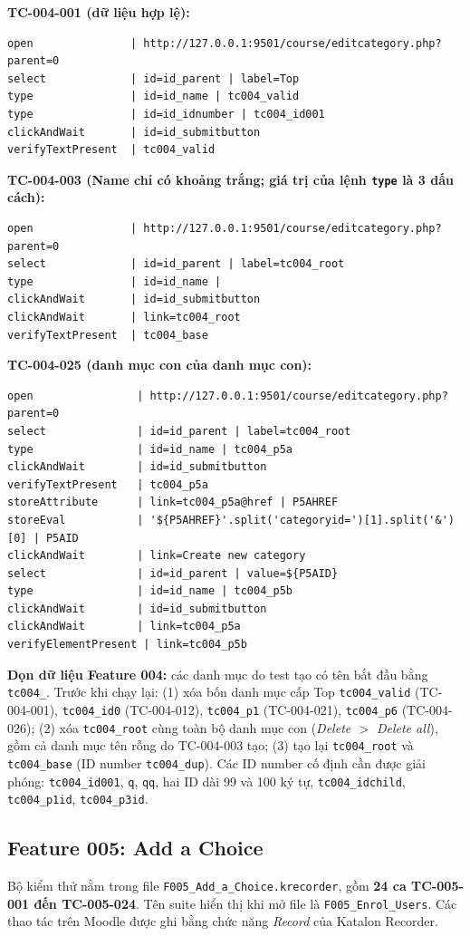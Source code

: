 \documentclass[12pt,a4paper]{article}
\begin{document}
\textbf{TC-004-001 (dữ liệu hợp lệ):}
\begin{lstlisting}
open               | http://127.0.0.1:9501/course/editcategory.php?parent=0
select             | id=id_parent | label=Top
type               | id=id_name | tc004_valid
type               | id=id_idnumber | tc004_id001
clickAndWait       | id=id_submitbutton
verifyTextPresent  | tc004_valid
\end{lstlisting}

\textbf{TC-004-003 (Name chỉ có khoảng trắng; giá trị của lệnh \texttt{type} là 3 dấu cách):}
\begin{lstlisting}
open               | http://127.0.0.1:9501/course/editcategory.php?parent=0
select             | id=id_parent | label=tc004_root
type               | id=id_name |    
clickAndWait       | id=id_submitbutton
clickAndWait       | link=tc004_root
verifyTextPresent  | tc004_base
\end{lstlisting}

\textbf{TC-004-025 (danh mục con của danh mục con):}
\begin{lstlisting}
open                | http://127.0.0.1:9501/course/editcategory.php?parent=0
select              | id=id_parent | label=tc004_root
type                | id=id_name | tc004_p5a
clickAndWait        | id=id_submitbutton
verifyTextPresent   | tc004_p5a
storeAttribute      | link=tc004_p5a@href | P5AHREF
storeEval           | '${P5AHREF}'.split('categoryid=')[1].split('&')[0] | P5AID
clickAndWait        | link=Create new category
select              | id=id_parent | value=${P5AID}
type                | id=id_name | tc004_p5b
clickAndWait        | id=id_submitbutton
clickAndWait        | link=tc004_p5a
verifyElementPresent | link=tc004_p5b
\end{lstlisting}

\textbf{Dọn dữ liệu Feature 004:} các danh mục do test tạo có tên bắt đầu bằng \texttt{tc004\_}. Trước khi chạy lại:
(1) xóa bốn danh mục cấp Top \texttt{tc004\_valid} (TC-004-001), \texttt{tc004\_id0} (TC-004-012), \texttt{tc004\_p1} (TC-004-021),
\texttt{tc004\_p6} (TC-004-026); (2) xóa \texttt{tc004\_root} cùng toàn bộ danh mục con (\textit{Delete $>$ Delete all}), gồm cả danh mục tên rỗng do
TC-004-003 tạo; (3) tạo lại \texttt{tc004\_root} và \texttt{tc004\_base} (ID number \texttt{tc004\_dup}). Các ID number cố định cần được giải phóng:
\texttt{tc004\_id001}, \texttt{q}, \texttt{qq}, hai ID dài 99 và 100 ký tự, \texttt{tc004\_idchild}, \texttt{tc004\_p1id}, \texttt{tc004\_p3id}.
\subsection{Feature 005: Add a Choice}
Bộ kiểm thử nằm trong file \texttt{F005\_Add\_a\_Choice.krecorder}, gồm \textbf{24 ca TC-005-001 đến TC-005-024}. Tên suite hiển thị khi mở file là \texttt{F005\_Enrol\_Users}. Các thao tác trên Moodle được ghi bằng chức năng \textit{Record} của Katalon Recorder.
\end{document}
